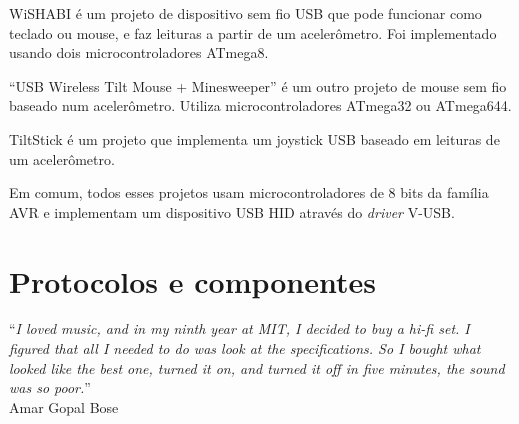 \documentclass[brazil,pagestart=firstchapter]{abnt}
\begin{document}
WiSHABI \cite{WiSHABI} é um projeto de dispositivo sem fio \acs{USB} que
pode funcionar como teclado ou mouse, e faz leituras a partir de um
acelerômetro. Foi implementado usando dois microcontroladores ATmega8.

``USB Wireless Tilt Mouse + Minesweeper'' \cite{USBWirelessTiltMouse} é um
outro projeto de mouse sem fio baseado num acelerômetro. Utiliza
microcontroladores ATmega32 ou ATmega644.

TiltStick \cite{TiltStick} é um projeto que implementa um joystick \acs{USB}
baseado em leituras de um acelerômetro.

Em comum, todos esses projetos usam microcontroladores de 8 bits da família
AVR e implementam um dispositivo \acs{USB} \acs{HID} através do
\textit{driver} V-USB.



%
%



\chapter{Protocolos e componentes}
\label{cap:protocolos_e_componentes}


\vfill{}
\begin{flushright}{}
``\emph{I loved music, and in my ninth year at MIT, I decided to buy a hi-fi
set. I figured that all I needed to do was look at the specifications. So I
bought what looked like the best one, turned it on, and turned it off in
five minutes, the sound was so poor.}''\\
{\small Amar Gopal Bose}
\end{flushright}{\small \par}
\vfill{}

\newpage
\end{document}
